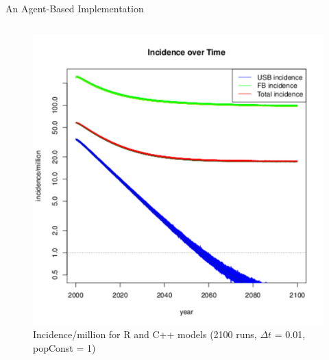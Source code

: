 \documentclass[final]{beamer}
\begin{document}
\begin{frame}
\begin{columns}[T]
\begin{column}{.3\textwidth}
\begin{block}{An Agent-Based Implementation}
\begin{columns}
\begin{column}{.45\textwidth}
\begin{figure}[h]
              \begin{center}
                \includegraphics[width=\textwidth]{finalRunSmall2}
              \end{center}
              \caption{Incidence/million for R and C++ models (2100 runs, $\Delta t$ = 0.01, popConst = 1)}
              \label{fig:finalRun}
            \end{figure}
          \end{column}
        \end{columns}
      \end{block}
      

\end{column}
\end{columns}
\end{frame}
\end{document}
